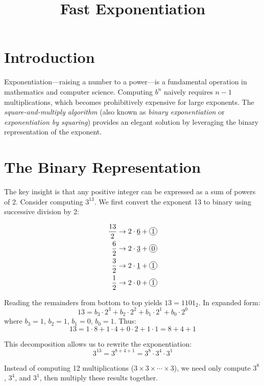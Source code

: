 \documentclass{article}
\newcommand*\circled[1]{\tikz[baseline=(char.base)]{
		\node[shape=circle,draw,inner sep=1pt] (char) {#1};}}
\begin{document}
	
	\title{Fast Exponentiation}
	\author{}
	\date{}
	\maketitle
	
	\tableofcontents
	
	\section{Introduction}
	
	Exponentiation---raising a number to a power---is a fundamental operation in mathematics and computer science. Computing $b^n$ naively requires $n-1$ multiplications, which becomes prohibitively expensive for large exponents. The \emph{square-and-multiply algorithm} (also known as \emph{binary exponentiation} or \emph{exponentiation by squaring}) provides an elegant solution by leveraging the binary representation of the exponent.
	
	\section{The Binary Representation}
	
	The key insight is that any positive integer can be expressed as a sum of powers of 2. Consider computing $3^{13}$. We first convert the exponent 13 to binary using successive division by 2:
	
    \begin{align*}
		\frac{13}{2} & \rightarrow 2 \cdot \underline{6} + \circled{1} \\
		\frac{6}{2} & \rightarrow 2 \cdot \underline{3} + \circled{0} \\
		\frac{3}{2} & \rightarrow 2 \cdot \underline{1} + \circled{1} \\
		\frac{1}{2} & \rightarrow 2 \cdot 0 + \circled{1} \\
	\end{align*}
	
	Reading the remainders from bottom to top yields $13 = 1101_2$. In expanded form:
	\[
	13 = b_3 \cdot 2^3 + b_2 \cdot 2^2 + b_1 \cdot 2^1 + b_0 \cdot 2^0
	\]
	where $b_3 = 1$, $b_2 = 1$, $b_1 = 0$, $b_0 = 1$. Thus:
	\[
	13 = 1 \cdot 8 + 1 \cdot 4 + 0 \cdot 2 + 1 \cdot 1 = 8 + 4 + 1
	\]
	
	This decomposition allows us to rewrite the exponentiation:
	\[
	3^{13} = 3^{8+4+1} = 3^8 \cdot 3^4 \cdot 3^1
	\]
	
	Instead of computing 12 multiplications ($3 \times 3 \times \cdots \times 3$), we need only compute $3^8$, $3^4$, and $3^1$, then multiply these results together.
	
\end{document}
